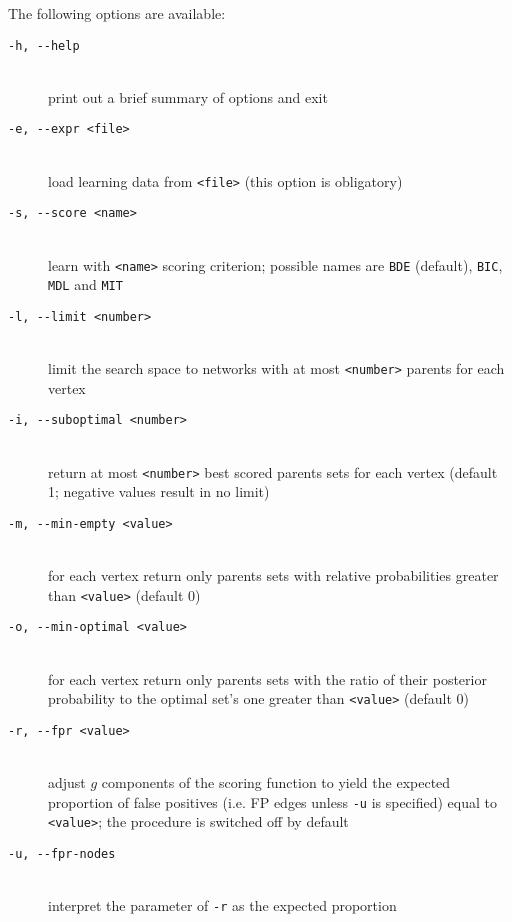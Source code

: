 The following options are available:
\begin{description}
\item[\texttt{-h, -\hspace{0pt}-help}]~\\
 print out a brief summary of options and exit
\item[\texttt{-e, -\hspace{0pt}-expr <file>}]~\\
 load learning data from \texttt{<file>} (this option is obligatory)
\item[\texttt{-s, -\hspace{0pt}-score <name>}]~\\
 learn with \texttt{<name>} scoring criterion;
 possible names are \texttt{BDE} (default), \texttt{BIC}, \texttt{MDL} and \texttt{MIT}
\item[\texttt{-l, -\hspace{0pt}-limit <number>}]~\\
 limit the search space to networks with at most 
 \texttt{<number>} parents for each vertex
\item[\texttt{-i, -\hspace{0pt}-suboptimal <number>}]~\\
 return at most \texttt{<number>} best scored parents sets for each vertex 
 (default 1; negative values result in no limit)
\item[\texttt{-m, -\hspace{0pt}-min-empty <value>}]~\\
 for each vertex return only parents sets with relative probabilities 
 greater than \texttt{<value>} (default 0)
\item[\texttt{-o, -\hspace{0pt}-min-optimal <value>}]~\\
 for each vertex return only parents sets with the ratio of their
 posterior probability to the optimal set's one
 greater than \texttt{<value>} (default 0)
\item[\texttt{-r, -\hspace{0pt}-fpr <value>}]~\\
 adjust $g$ components of the scoring function to yield
 the expected proportion of false positives 
 (i.e. FP edges unless \texttt{-u} is specified)
 equal to \texttt{<value>};
 the procedure is switched off by default
 \item[\texttt{-u, -\hspace{0pt}-fpr-nodes}]~\\
 interpret the parameter of \texttt{-r} as the expected proportion 

\end{description}
